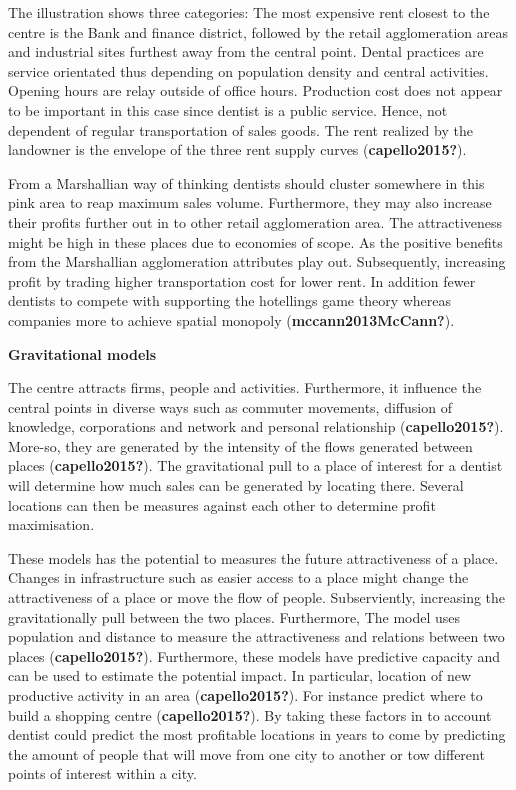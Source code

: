 \documentclass[
  10,
  a4paper,
]{article}
\begin{document}
The illustration shows three categories: The most expensive rent closest
to the centre is the Bank and finance district, followed by the retail
agglomeration areas and industrial sites furthest away from the central
point. Dental practices are service orientated thus depending on
population density and central activities. Opening hours are relay
outside of office hours. Production cost does not appear to be important
in this case since dentist is a public service. Hence, not dependent of
regular transportation of sales goods. The rent realized by the
landowner is the envelope of the three rent supply curves
(\textbf{capello2015?}).

From a Marshallian way of thinking dentists should cluster somewhere in
this pink area to reap maximum sales volume. Furthermore, they may also
increase their profits further out in to other retail agglomeration
area. The attractiveness might be high in these places due to economies
of scope. As the positive benefits from the Marshallian agglomeration
attributes play out. Subsequently, increasing profit by trading higher
transportation cost for lower rent. In addition fewer dentists to
compete with supporting the hotellings game theory whereas companies
more to achieve spatial monopoly (\textbf{mccann2013McCann?}).

\textbf{Gravitational models}

The centre attracts firms, people and activities. Furthermore, it
influence the central points in diverse ways such as commuter movements,
diffusion of knowledge, corporations and network and personal
relationship (\textbf{capello2015?}). More-so, they are generated by the
intensity of the flows generated between places (\textbf{capello2015?}).
The gravitational pull to a place of interest for a dentist will
determine how much sales can be generated by locating there. Several
locations can then be measures against each other to determine profit
maximisation.

These models has the potential to measures the future attractiveness of
a place. Changes in infrastructure such as easier access to a place
might change the attractiveness of a place or move the flow of people.
Subserviently, increasing the gravitationally pull between the two
places. Furthermore, The model uses population and distance to measure
the attractiveness and relations between two places
(\textbf{capello2015?}). Furthermore, these models have predictive
capacity and can be used to estimate the potential impact. In
particular, location of new productive activity in an area
(\textbf{capello2015?}). For instance predict where to build a shopping
centre (\textbf{capello2015?}). By taking these factors in to account
dentist could predict the most profitable locations in years to come by
predicting the amount of people that will move from one city to another
or tow different points of interest within a city.
\end{document}
